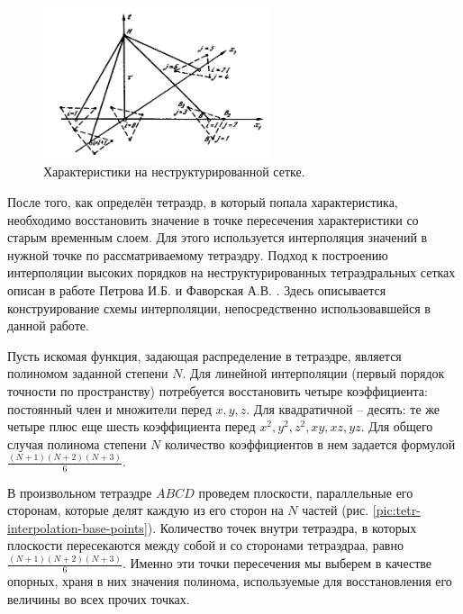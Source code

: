 \begin{figure}[h]
\centering
\includegraphics[width=0.6\textwidth]{png/characteristics-2d-triangles-inner.png}
\caption{Характеристики на неструктурированной сетке.}
\label{pic:gcm_2d}
\end{figure}

После того, как определён тетраэдр, в который попала характеристика, необходимо восстановить значение в точке пересечения характеристики со старым временным слоем. Для этого используется интерполяция значений в нужной точке по рассматриваемому тетраэдру. Подход к построению интерполяции высоких порядков на неструктурированных тетраэдральных сетках описан в работе Петрова И.Б. и Фаворская А.В. \cite{interpolation_3d}. Здесь описывается конструирование схемы интерполяции, непосредственно использовавшейся в данной работе.

Пусть искомая функция, задающая распределение в тетраэдре, является полиномом заданной степени $N$. Для линейной интерполяции (первый порядок точности по пространству) потребуется восстановить четыре коэффициента: постоянный член и множители перед $x, y, z$. Для квадратичной -- десять: те же четыре плюс еще шесть коэффициента перед $x^2, y^2, z^2, xy, xz, yz$. Для общего случая полинома степени $N$ количество коэффициентов в нем задается формулой $\frac{(N+1)(N+2)(N+3)}{6}$.

В произвольном тетраэдре $ABCD$ проведем плоскости, параллельные его сторонам, которые делят каждую из его сторон на $N$ частей (рис. \ref{pic:tetr-interpolation-base-points}). Количество точек внутри тетраэдра, в которых плоскости пересекаются между собой и со сторонами тетраэдраа, равно $\frac{(N+1)(N+2)(N+3)}{6}$. Именно эти точки пересечения мы выберем в качестве опорных, храня в них значения полинома, используемые для восстановления его величины во всех прочих точках.

